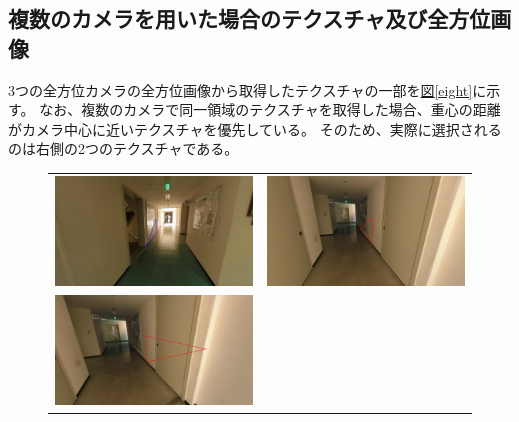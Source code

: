 \documentclass[]{jarticle}          %
\begin{document}
\subsection{複数のカメラを用いた場合のテクスチャ及び全方位画像}
3つの全方位カメラの全方位画像から取得したテクスチャの一部を\hyperref[eight]{図\ref{eight}}に示す。
なお、複数のカメラで同一領域のテクスチャを取得した場合、重心の距離がカメラ中心に近いテクスチャを優先している。
そのため、実際に選択されるのは右側の2つのテクスチャである。

\begin{figure}[H]
  \begin{center}
    \begin{tabular}{cc}
      \includegraphics[keepaspectratio, scale=0.08]{figures/texture012/texture_0_13.png}&
      \includegraphics[keepaspectratio, scale=0.08]{figures/texture012/texture_2_10.png}\\
      \includegraphics[keepaspectratio, scale=0.08]{figures/texture012/texture_2_12.png}&

\end{tabular}
\end{center}
\end{figure}
\end{document}
